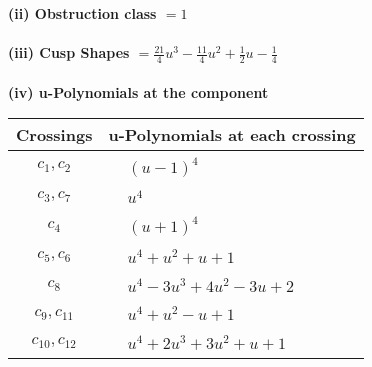 \documentclass[1p]{elsarticle_modified}
\theoremstyle{definition}
\begin{document}
\flushleft \textbf{(ii) Obstruction class $= 1$}\\~\\
\flushleft \textbf{(iii) Cusp Shapes $= \frac{21}{4} u^3-\frac{11}{4} u^2+\frac{1}{2} u-\frac{1}{4}$}\\~\\
\newpage\renewcommand{\arraystretch}{1}
\flushleft \textbf{(iv) u-Polynomials at the component}\newline \\
\begin{tabular}{m{50pt}|m{274pt}}
Crossings & \hspace{64pt}u-Polynomials at each crossing \\
\hline $$\begin{aligned}c_{1},c_{2}\end{aligned}$$&$\begin{aligned}
&(u-1)^4
\end{aligned}$\\
\hline $$\begin{aligned}c_{3},c_{7}\end{aligned}$$&$\begin{aligned}
&u^4
\end{aligned}$\\
\hline $$\begin{aligned}c_{4}\end{aligned}$$&$\begin{aligned}
&(u+1)^4
\end{aligned}$\\
\hline $$\begin{aligned}c_{5},c_{6}\end{aligned}$$&$\begin{aligned}
&u^4+u^2+u+1
\end{aligned}$\\
\hline $$\begin{aligned}c_{8}\end{aligned}$$&$\begin{aligned}
&u^4-3 u^3+4 u^2-3 u+2
\end{aligned}$\\
\hline $$\begin{aligned}c_{9},c_{11}\end{aligned}$$&$\begin{aligned}
&u^4+u^2- u+1
\end{aligned}$\\
\hline $$\begin{aligned}c_{10},c_{12}\end{aligned}$$&$\begin{aligned}
&u^4+2 u^3+3 u^2+u+1
\end{aligned}$\\
\hline
\end{tabular}\\~\\
\end{document}
